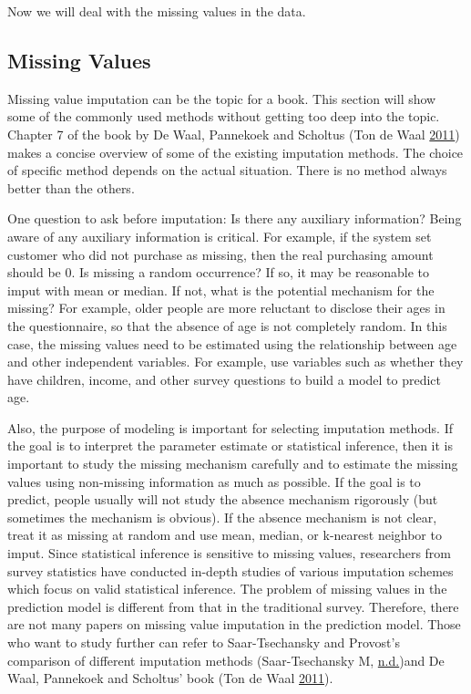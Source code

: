 \documentclass[
]{article}
\begin{document}
Now we will deal with the missing values in the data.

\hypertarget{missing-values}{%
\subsection{Missing Values}\label{missing-values}}

Missing value imputation can be the topic for a book. This section will
show some of the commonly used methods without getting too deep into the
topic. Chapter 7 of the book by De Waal, Pannekoek and Scholtus (Ton de
Waal \protect\hyperlink{ref-impute1}{2011}) makes a concise overview of
some of the existing imputation methods. The choice of specific method
depends on the actual situation. There is no method always better than
the others.

One question to ask before imputation: Is there any auxiliary
information? Being aware of any auxiliary information is critical. For
example, if the system set customer who did not purchase as missing,
then the real purchasing amount should be 0. Is missing a random
occurrence? If so, it may be reasonable to imput with mean or median. If
not, what is the potential mechanism for the missing? For example, older
people are more reluctant to disclose their ages in the questionnaire,
so that the absence of age is not completely random. In this case, the
missing values need to be estimated using the relationship between age
and other independent variables. For example, use variables such as
whether they have children, income, and other survey questions to build
a model to predict age.

Also, the purpose of modeling is important for selecting imputation
methods. If the goal is to interpret the parameter estimate or
statistical inference, then it is important to study the missing
mechanism carefully and to estimate the missing values using non-missing
information as much as possible. If the goal is to predict, people
usually will not study the absence mechanism rigorously (but sometimes
the mechanism is obvious). If the absence mechanism is not clear, treat
it as missing at random and use mean, median, or k-nearest neighbor to
imput. Since statistical inference is sensitive to missing values,
researchers from survey statistics have conducted in-depth studies of
various imputation schemes which focus on valid statistical inference.
The problem of missing values in the prediction model is different from
that in the traditional survey. Therefore, there are not many papers on
missing value imputation in the prediction model. Those who want to
study further can refer to Saar-Tsechansky and Provost's comparison of
different imputation methods (Saar-Tsechansky M,
\protect\hyperlink{ref-missing1}{n.d.})and De Waal, Pannekoek and
Scholtus' book (Ton de Waal \protect\hyperlink{ref-impute1}{2011}).
\end{document}
